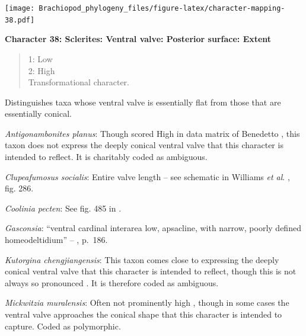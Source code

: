 \documentclass[openany]{book}
\theoremstyle{definition}
\theoremstyle{definition}
\theoremstyle{definition}
\theoremstyle{remark}
\begin{document}
\texttt{[image: Brachiopod\_phylogeny\_files/figure-latex/character-mapping-38.pdf]}

\textbf{Character 38: Sclerites: Ventral valve: Posterior surface:
Extent}

\begin{quote}
1: Low\\
2: High\\
Transformational character.
\end{quote}

Distinguishes taxa whose ventral valve is essentially flat from those
that are essentially conical.

\hypertarget{Antigonambonites_planus-coding-38}{}
\emph{Antigonambonites planus}: Though scored High in data matrix of
Benedetto \citeyearpar{Benedetto2009iChaniella}, this taxon
\citep[see][fig. 508]{Williams2000LinguliformeaCraniiformea} does not
express the deeply conical ventral valve that this character is intended
to reflect. It is charitably coded as ambiguous.

\hypertarget{Clupeafumosus_socialis-coding-38}{}
\emph{Clupeafumosus socialis}: Entire valve length -- see schematic in
Williams \emph{et al}. \citeyearpar{Williams1997Introduction}, fig. 286.

\hypertarget{Coolinia_pecten-coding-38}{}
\emph{Coolinia pecten}: See fig. 485 in
\citet{Williams2000LinguliformeaCraniiformea}.

\hypertarget{Gasconsia-coding-38}{}
\emph{Gasconsia}: ``ventral cardinal interarea low, apsacline, with
narrow, poorly defined homeodeltidium'' --
\citet{Williams2000LinguliformeaCraniiformea}, p.~186.

\hypertarget{Kutorgina_chengjiangensis-coding-38}{}
\emph{Kutorgina chengjiangensis}: This taxon
\citetext{\citealp[see][fig.
129]{Williams2000LinguliformeaCraniiformea}; \citealp[fig.
1]{Popov1992TheCambrian}} comes close to expressing the deeply conical
ventral valve that this character is intended to reflect, though this is
not always so pronounced \citep[e.g.][fig.
125]{Williams2000LinguliformeaCraniiformea}. It is therefore coded as
ambiguous.

\hypertarget{Mickwitzia_muralensis-coding-38}{}
\emph{Mickwitzia muralensis}: Often not prominently high
\citep{Skovsted2003EarlyCambrian, Balthasar2004Shellstructure}, though
in some cases \citep[e.g.][]{Butler2015Exceptionallypreserved} the
ventral valve approaches the conical shape that this character is
intended to capture. Coded as polymorphic.
\end{document}
